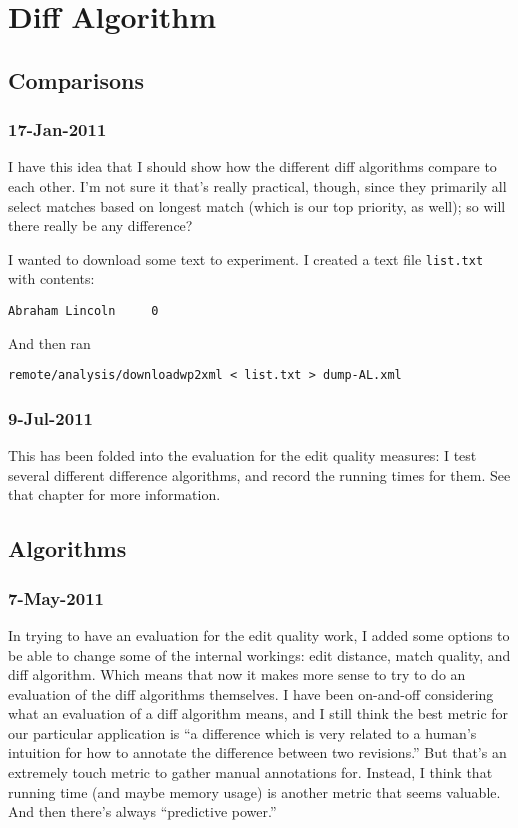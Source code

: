 \chapter{Diff Algorithm}

\section{Comparisons}

\subsection{17-Jan-2011}

I have this idea that I should show how the different
diff algorithms compare to each other.
I'm not sure it that's really practical, though, since
they primarily all select matches based on longest match
(which is our top priority, as well); so will there really be
any difference?

I wanted to download some text to experiment.
I created a text file \texttt{list.txt} with contents:
\begin{verbatim}
Abraham Lincoln     0
\end{verbatim}
And then ran
\begin{verbatim}
remote/analysis/downloadwp2xml < list.txt > dump-AL.xml
\end{verbatim}

\subsection{9-Jul-2011}

This has been folded into the evaluation for the
edit quality measures: I test several different difference
algorithms, and record the running times for them.
See that chapter for more information.

\section{Algorithms}

\subsection{7-May-2011}

In trying to have an evaluation for the edit quality work,
I added some options to be able to change some of the internal workings:
edit distance, match quality, and diff algorithm.
Which means that now it makes more sense to try to do an evaluation
of the diff algorithms themselves.
I have been on-and-off considering what an evaluation of a diff algorithm
means, and I still think the best metric for our particular application
is ``a difference which is very related to a human's intuition for
how to annotate the difference between two revisions.''
But that's an extremely touch metric to gather manual annotations for.
Instead, I think that running time (and maybe memory usage) is another
metric that seems valuable.
And then there's always ``predictive power.''

